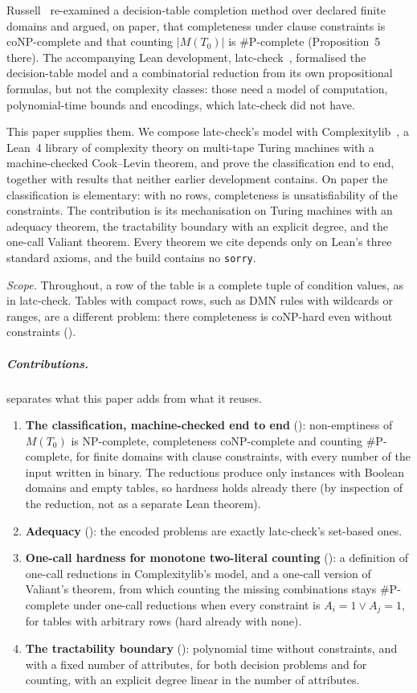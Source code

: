 \documentclass[a4paper,UKenglish,cleveref,autoref,thm-restate]{lipics-v2021}
\begin{document}
Russell~\cite{PaperA} re-examined a decision-table completion method over declared finite
domains and argued, on paper, that completeness under clause constraints is coNP-complete and
that counting $|M(T_0)|$ is \#P-complete (Proposition~5 there). The accompanying Lean
development, latc-check~\cite{latc_check_0_1_0}, formalised the decision-table model and a
combinatorial reduction from its own propositional formulas, but not the complexity classes: those need a model of computation,
polynomial-time bounds and encodings, which latc-check did not have.

This paper supplies them. We compose latc-check's model with Complexitylib~\cite{Complexitylib},
a Lean~4 library of complexity theory on multi-tape Turing machines with a machine-checked
Cook--Levin theorem, and prove the classification end to end, together with results that neither
earlier development contains. On paper the classification is elementary: with no rows,
completeness is unsatisfiability of the constraints. The contribution is its mechanisation on
Turing machines with an adequacy theorem, the tractability boundary with an explicit degree, and
the one-call Valiant theorem. Every theorem we cite depends only on Lean's three standard
axioms, and the build contains no \lstinline{sorry}.

\emph{Scope.} Throughout, a row of the table is a complete tuple of condition values, as in
latc-check. Tables with compact rows, such as DMN rules with wildcards or ranges, are a different
problem: there completeness is coNP-hard even without constraints ().

\subparagraph*{Contributions.}
 separates what this paper adds from what it reuses.
\begin{enumerate}
\item \textbf{The classification, machine-checked end to end} ():
  non-emptiness of $M(T_0)$ is NP-complete, completeness coNP-complete and counting \#P-complete,
  for finite domains with clause constraints, with every number of the input written in binary.
  The reductions produce only instances with Boolean domains and empty tables, so hardness
  holds already there (by inspection of the reduction, not as a separate Lean theorem).
\item \textbf{Adequacy} (): the encoded problems are exactly latc-check's
  set-based ones.
\item \textbf{One-call hardness for monotone two-literal counting} (): a
  definition of one-call reductions in Complexitylib's model, and a one-call version of Valiant's
  theorem, from which counting the missing combinations stays \#P-complete under one-call
  reductions when every constraint is $A_i = 1 \lor A_j = 1$, for tables with arbitrary rows (hard already with none).
\item \textbf{The tractability boundary} (): polynomial time without
  constraints, and with a fixed number of attributes, for both decision problems and for
  counting, with an explicit degree linear in the number of attributes.
\end{enumerate}
\end{document}
